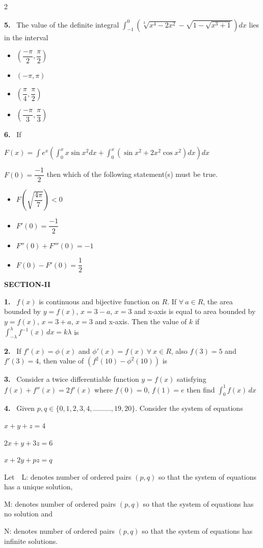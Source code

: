 \documentclass[10pt]{extarticle}
\newcommand{\sect}[1]{\par\smallskip\noindent\textbf{#1}\par}
\newcommand{\qn}[1]{\par\smallskip\noindent\textbf{#1.}~}
\newenvironment{qoptions}{\begin{itemize}[leftmargin=1.8em,itemsep=1pt,topsep=2pt,label={}]}{\end{itemize}}
\newcommand{\opt}[2]{\item[(#1)] #2}
\begin{document}
\begin{multicols}{2}
\begin{qoptions}
\end{qoptions}
\qn{5} The value of the definite integral $\displaystyle\int_{-1}^0\left(\sqrt[3]{x^4-2x^2}-\sqrt{1-\sqrt{x^3+1}}\right)dx$ lies in the interval
\begin{qoptions}
\opt{A}{$\left(\dfrac{-\pi}2,\dfrac\pi2\right)$}
\opt{B}{$(-\pi,\pi)$}
\opt{C}{$\left(\dfrac\pi4,\dfrac\pi2\right)$}
\opt{D}{$\left(\dfrac{-\pi}3,\dfrac\pi3\right)$}
\end{qoptions}
\qn{6} If\par\noindent\hfill$F(x)=\displaystyle\int e^x\left(\int_0^xx\sin x^2dx+\int_0^x\left(\sin x^2+2x^2\cos x^2\right)dx\right)dx$\hfill\null\par\noindent$F(0)=\dfrac{-1}2$ then which of the following statement(s) must be true.
\begin{qoptions}
\opt{A}{$F\left(\sqrt{\dfrac{4\pi}7}\right)<0$}
\opt{B}{$F'(0)=\dfrac{-1}2$}
\opt{C}{$F''(0)+F'''(0)=-1$}
\opt{D}{$F(0)-F'(0)=\dfrac12$}
\end{qoptions}
\sect{SECTION-II}
\qn{1} $f(x)$ is continuous and bijective function on $R$. If $\forall\ a\in R$, the area bounded by $y=f(x)$, $x=3-a$, $x=3$ and x-axis is equal to area bounded by $y=f(x)$, $x=3+a$, $x=3$ and x-axis. Then the value of $k$ if $\displaystyle\int_{-\lambda}^{\lambda}f^{-1}(x)\,dx=k\lambda$ is
\qn{2} If $f'(x)=\phi(x)$ and $\phi'(x)=f(x)\ \forall\ x\in R$, also $f(3)=5$ and $f'(3)=4$, then value of $\left(f^2(10)-\phi^2(10)\right)$ is
\qn{3} Consider a twice differentiable function $y=f(x)$ satisfying $f(x)+f''(x)=2f'(x)$ where $f(0)=0$, $f(1)=e$ then find $\displaystyle\int_0^1f(x)\,dx$
\qn{4} Given $p,q\in\{0,1,2,3,4,\ldots\ldots\ldots,19,20\}$. Consider the system of equations\par
\hspace*{1.5em}$x+y+z=4$\par
\hspace*{1.5em}$2x+y+3z=6$\par
\hspace*{1.5em}$x+2y+pz=q$\par
Let\ \ L: denotes number of ordered pairs $(p,q)$ so that the system of equations has a unique solution,\par
\hspace*{1.2em}M: denotes number of ordered pairs $(p,q)$ so that the system of equations has no solution and\par
\hspace*{1.2em}N: denotes number of ordered pairs $(p,q)$ so that the system of equations has infinite solutions.\par

\end{multicols}
\end{document}
